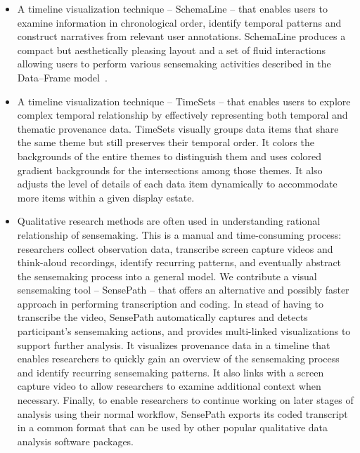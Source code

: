 \begin{itemize}
	\item A timeline visualization technique -- SchemaLine -- that enables users to examine information in chronological order, identify temporal patterns and construct narratives from relevant user annotations. SchemaLine produces a compact but aesthetically pleasing layout and a set of fluid interactions allowing users to perform various sensemaking activities described in the Data--Frame model~\cite{Klein2003}.
	
	\item A timeline visualization technique -- TimeSets -- that enables users to explore complex temporal relationship by effectively representing both temporal and thematic provenance data. TimeSets visually groups data items that share the same theme but still preserves their temporal order. It colors the backgrounds of the entire themes to distinguish them and uses colored gradient backgrounds for the intersections among those themes. It also adjusts the level of details of each data item dynamically to accommodate more items within a given display estate. 
	
	\item Qualitative research methods are often used in understanding rational relationship of sensemaking. This is a manual and time-consuming process: researchers collect observation data, transcribe screen capture videos and think-aloud recordings, identify recurring patterns, and eventually abstract the sensemaking process into a general model. We contribute a visual sensemaking tool -- SensePath -- that offers an alternative and possibly faster approach in performing transcription and coding. In stead of having to transcribe the video, SensePath automatically captures and detects participant's sensemaking actions, and provides multi-linked visualizations to support further analysis. It visualizes provenance data in a timeline that enables researchers to quickly gain an overview of the sensemaking process and identify recurring sensemaking patterns. It also links with a screen capture video to allow researchers to examine  additional context when necessary. Finally, to enable researchers to continue working on later stages of analysis using their normal workflow, SensePath exports its coded transcript in a common format that can be used by other popular qualitative data analysis software packages.	
	

\end{itemize}
